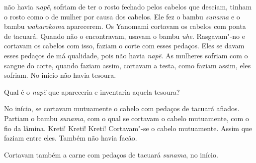  

 não havia \emph{napë}, sofriam de ter o rosto fechado pelos
cabelos que desciam, tinham o rosto como o de mulher por causa dos
cabelos. Ele fez o bambu \emph{sunama} e o
bambu \emph{waharokoma} aparecerem\emph{.} Os Yanomami cortavam os
cabelos com ponta de tacuará. Quando não o encontravam, usavam o
bambu \emph{uhe}. Rasgavam"-no e cortavam os cabelos com isso, faziam o
corte com esses pedaços. Eles se davam esses pedaços de má qualidade,
pois não havia \emph{napë}. As mulheres sofriam com o sangue do corte,
quando faziam assim, cortavam a testa, como faziam assim, eles sofriam.
No início não havia tesoura. 

Qual é o \emph{napë} que apareceria e inventaria aquela tesoura?

No início, se cortavam mutuamente o cabelo com pedaços de tacuará
afiados. Partiam o bambu \emph{sunama}, com o qual se cortavam o cabelo
mutuamente, com o fio da lâmina. Kreti! Kreti! Kreti! Cortavam"-se o
cabelo mutuamente. Assim que faziam entre eles. Também não havia facão. 

Cortavam também a carne com pedaços de tacuará \emph{sunama}, no início.

 
